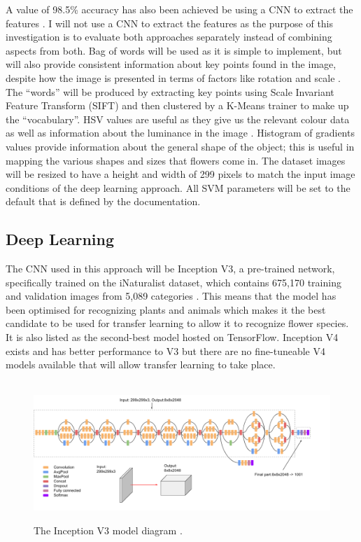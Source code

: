 \documentclass[12pt,a4paper]{report}
\begin{document}
A value of 98.5\% accuracy has also been achieved be using a CNN to extract the features 
\citep{mete}. I will not use a CNN to extract the features as the purpose of this investigation is to evaluate both 
approaches separately instead of combining aspects from both. Bag of words will be used as it is simple to implement, 
but will also provide consistent information about key points found in the image, despite how the image is presented in 
terms of factors like rotation and scale \citep{mohan}.
The “words” will be produced by extracting key points using Scale Invariant Feature
Transform (SIFT) and then clustered by a K-Means trainer to make up the “vocabulary”. HSV values are useful as they give
us the relevant colour data as well as information about the 
luminance in the image \citep{chapelle1999support}. Histogram of gradients values provide information about the general
shape of the object; this is useful in mapping the various shapes and sizes that flowers come in. The dataset images 
will be resized to have a height and width of 
299 pixels to match the input image conditions of the deep learning approach. All SVM parameters will be set to the 
default that is defined by the documentation.

\subsection{Deep Learning}

The CNN used in this approach will be Inception V3, a pre-trained network, specifically trained on the iNaturalist 
dataset, which contains 675,170 training and validation images from 5,089 categories \citep{paperswithcode}. 
This means that the model has been optimised for recognizing plants and animals which makes it the best candidate to be 
used for transfer learning to allow it to recognize flower species. It is also listed as the second-best model hosted on
TensorFlow. Inception V4 exists and has better performance to V3 but there are no fine-tuneable V4 models available that
will allow transfer learning to take place.   

\begin{figure}[h]\
    \centering
    \includegraphics[width=\textwidth]{inceptionv3.png}
    \caption{The Inception V3 model diagram \citep{GoogleCloud}.}
    \label{fig:inception}
\end{figure}
\end{document}
